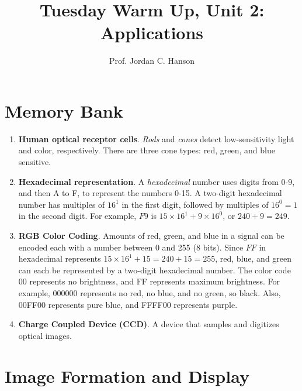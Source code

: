 \documentclass{article}
\begin{document}
\twocolumn

\title{Tuesday Warm Up, Unit 2: Applications}
\author{Prof. Jordan C. Hanson}
\maketitle

\section{Memory Bank}

\begin{enumerate}
\item \textbf{Human optical receptor cells}.  \textit{Rods} and \textit{cones} detect low-sensitivity light and color, respectively.  There are three cone types: red, green, and blue sensitive.
\item \textbf{Hexadecimal representation}.  A \textit{hexadecimal} number uses digits from 0-9, and then A to F, to represent the numbers 0-15.  A two-digit hexadecimal number has multiples of $16^{1}$ in the first digit, followed by multiples of $16^{0} = 1$ in the second digit.  For example, $F9$ is $15 \times 16^1 + 9 \times 16^0$, or $240 + 9 = 249$.
\item \textbf{RGB Color Coding}.  Amounts of red, green, and blue in a signal can be encoded each with a number between 0 and 255 (8 bits).  Since $FF$ in hexadecimal represents $15 \times 16^1 + 15 = 240+15=255$, red, blue, and green can each be represented by a two-digit hexadecimal number.  The color code $00$ represents no brightness, and FF represents maximum brightness.  For example, 000000 represents no red, no blue, and no green, so black.  Also, 00FF00 represents pure blue, and FFFF00 represents purple.
\item \textbf{Charge Coupled Device (CCD)}.  A device that samples and digitizes optical images.
\end{enumerate}

\section{Image Formation and Display}
\end{document}

